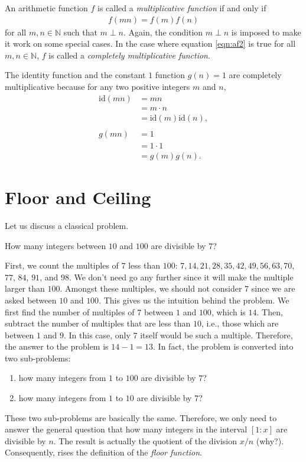 \documentclass[12pt]{subfile}
\begin{document}
		\begin{definition}
			An arithmetic function $f$ is called a \textit{multiplicative function} if and only if
				\begin{align}
				f(mn)=f(m)f(n)\label{eqn:af2}
				\end{align}
			for all $m,n\in\mathbb{N}$ such that $m\perp n$. Again, the condition $m\perp n$ is imposed to make it work on some special cases. In the case where equation \ref{eqn:af2} is true for all $m,n\in\mathbb{N}$, $f$ is called a \textit{completely multiplicative function}.
		\end{definition}

		\begin{example}
			The identity function and the constant $1$ function $g(n)=1$ are completely multiplicative because for any two positive integers $m$ and $n$,
				\begin{align*}
					\text{id}(mn) &= mn \\
								  &= m \cdot n\\
								  &= \text{id}(m) \text{id}(n),\\
								  \\
							g(mn) &= 1\\
								  &= 1 \cdot 1\\
								  &= g(m)g(n).
				\end{align*}
		\end{example}
\section{Floor and Ceiling}
    Let us discuss a classical problem.
        \begin{problem} \label{floorproblem}
            How many integers between $10$ and $100$ are divisible by $7$?
        \end{problem}
    First, we count the multiples of $7$ less than $100$: $7, 14, 21, 28, 35, 42, 49, 56, 63, 70$, $77$, $84$, $91$, and $98$. We don't need go any further since it will make the multiple larger than $100$. Amongst these multiples, we should not consider $7$ since we are asked between $10$ and $100$. This gives us the intuition behind the problem. We first find the number of multiples of $7$ between $1$ and $100$, which is $14$. Then, subtract the number of multiples that are less than $10$, i.e., those which are between $1$ and $9$. In this case, only $7$ itself would be such a multiple. Therefore, the answer to the problem is $14-1=13$. In fact, the problem is converted into two sub-problems:
    	\begin{enumerate}
    		\item how many integers from $1$ to $100$ are divisible by $7$?
    		\item how many integers from $1$ to $10$ are divisible by $7$?
    	\end{enumerate}
    These two sub-problems are basically the same. Therefore, we only need to answer the general question that how many integers in the interval $[1:x]$ are divisible by $n$. The result is actually the quotient of the division $x/n$ (why?). Consequently, rises the definition of the \textit{floor function}.
\end{document}
